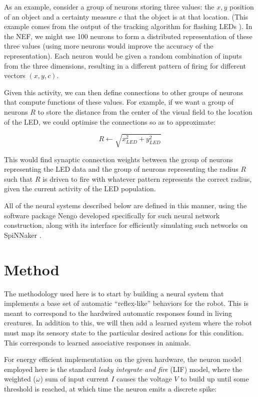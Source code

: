 \documentclass[conference]{IEEEtran}
\begin{document}
As an example, consider a group of neurons storing three values: the $x,y$ 
position of an object and a certainty measure $c$ that the object is at that
location.  (This example comes from the output of the tracking algorithm 
for flashing LEDs \cite{muller2011miniature}).  In the NEF, we might use 100 
neurons to form a distributed representation of these three values 
(using more neurons would improve the accuracy of the representation).  Each
neuron would be given a random combination of inputs from the three dimensions,
resulting in a different pattern of firing for different vectors $(x,y,c)$.

Given this activity, we can then define connections to other groups of neurons
that compute functions of these values. For example, if we want a group of 
neurons $R$ to store the distance from the center of the visual field to the 
location of the LED, we could optimise the connections so
as to approximate: 
 
\begin{equation}
    R \leftarrow \sqrt{x_{LED}^2 + y_{LED}^2}
\end{equation}

This would find synaptic connection weights between the group of neurons 
representing the LED data and the group of neurons representing the 
radius $R$ such that $R$ is driven to fire with whatever pattern represents 
the correct radius, given the current activity of the LED population. 

All of the neural systems described below are defined in this manner, using
the software package Nengo \cite{bekolay_nengo2014} developed specifically
for such neural network construction, along with its interface
for efficiently simulating such networks on SpiNNaker \cite{mundy2015}.

\section{Method}

The methodology used here is to start by building a neural system that
implements a base set of automatic ``reflex-like'' behaviors for the robot.
This is meant to correspond to the hardwired automatic responses found in
living creatures.  In addition to this, we will then add a learned system
where the robot must map its sensory state to the particular desired actions
for this condition.  This corresponds to learned associative responses
in animals.

For energy efficient implementation on the given hardware, the neuron model
employed here is the standard \textit{leaky integrate and fire} (LIF) model, 
where the weighted ($\omega$) sum of input current $I$ causes the voltage $V$ to build up until some
threshold is reached, at which time the neuron emits a discrete spike:
\end{document}
